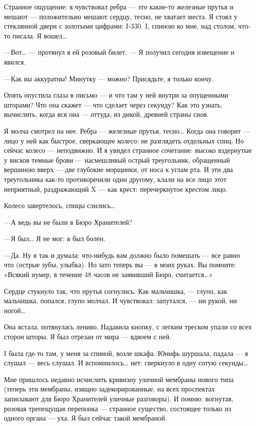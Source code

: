 \documentclass[11pt,openany]{book}
\begin{document}
Странное ощущение: я чувствовал ребра --- это какие-то железные прутья и мешают --- положительно мешают сердцу, тесно, не хватает места. Я стоял у стеклянной двери с золотыми цифрами: I-330. I, спиною ко мне, над столом, что-то писала. Я вошел\ldots{}

---Вот\ldots{} --- протянул я ей розовый билет. --- Я получил сегодня извещение и явился.

---Как вы аккуратны! Минутку --- можно? Присядьте, я только кончу.

Опять опустила глаза в письмо --- и что там у ней внутри за опущенными шторами? Что она скажет --- что сделает через секунду? Как это узнать, вычислить, когда вся она --- оттуда, из дикой, древней страны снов.

Я молча смотрел на нее. Ребра --- железные прутья, тесно\ldots{} Когда она говорит --- лицо у ней как быстрое, сверкающее колесо: не разглядеть отдельных спиц. Но сейчас колесо --- неподвижно. И я увидел странное сочетание: высоко вздернутые у висков темные брови --- насмешливый острый треугольник, обращенный вершиною вверх --- две глубокие морщинки, от носа к углам рта. И эти два треугольника как-то противоречили один другому, клали на все лицо этот неприятный, раздражающий X --- как крест: перечеркнутое крестом лицо.

Колесо завертелось, спицы слились\ldots{}

---А ведь вы не были в Бюро Хранителей?

---Я был\ldots{} Я не мог: я был болен.

---Да. Ну я так и думала: что-нибудь вам должно было помешать --- все равно что (острые зубы, улыбка). Но зато теперь вы --- в моих руках. Вы помните: «Всякий нумер, в течение 48 часов не заявивший Бюро, считается\ldots{}»

Сердце стукнуло так, что прутья согнулись. Как мальчишка, --- глупо, как мальчишка, попался, глупо молчал. И чувствовал: запутался, --- ни рукой, ни ногой\ldots{}

Она встала, потянулась лениво. Надавила кнопку, с легким треском упали со всех сторон шторы. Я был отрезан от мира --- вдвоем с ней.

I была где-то там, у меня за спиной, возле шкафа. Юнифь шуршала, падала --- я слушал --- весь слушал. И вспомнилось\ldots{} нет: сверкнуло в одну сотую секунды\ldots{}

Мне пришлось недавно исчислить кривизну уличной мембраны нового типа (теперь эти мембраны, изящно задекорированные, на всех проспектах записывают для Бюро Хранителей уличные разговоры). И помню: вогнутая, розовая трепещущая перепонка --- странное существо, состоящее только из одного органа --- уха. Я был сейчас такой мембраной.
\end{document}
